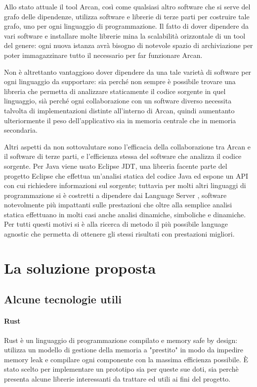 Allo stato attuale il tool Arcan, cos\`i come qualsiasi altro software che si serve del grafo delle dipendenze, utilizza software e librerie di terze parti per costruire tale grafo, uno per ogni linguaggio di programmazione. Il fatto di dover dipendere da vari software e installare molte librerie mina la scalabilit\`a orizzontale di un tool del genere: ogni nuova istanza avr\`a bisogno di notevole spazio di archiviazione per poter immagazzinare tutto il necessario per far funzionare Arcan.

Non \`e altrettanto vantaggioso dover dipendere da una tale variet\`a di software per ogni linguaggio da supportare: sia perch\'e non sempre \`e possibile trovare una libreria che permetta di analizzare staticamente il codice sorgente in quel linguaggio, si\`a perch\'e ogni collaborazione con un software diverso necessita talvolta di implementazioni distinte all'interno di Arcan, quindi aumentanto ulteriormente il peso dell'applicativo sia in memoria centrale che in memoria secondaria.

Altri aspetti da non sottovalutare sono l'efficacia della collaborazione tra Arcan e il software di terze parti, e l'efficienza stessa del software che analizza il codice sorgente. Per Java viene usato Eclipse JDT, una libreria facente parte del progetto Eclipse che effettua un'analisi statica del codice Java ed espone un API con cui richiedere informazioni sul sorgente; tuttavia per molti altri linguaggi di programmazione si \`e costretti a dipendere dai Language Server \cite{LanguageServer}, software notevolmente pi\`u impattanti sulle prestazioni che oltre alla semplice analisi statica effettuano in molti casi anche analisi dinamiche, simboliche e dinamiche. Per tutti questi motivi si \`e alla ricerca di metodo il pi\`u possibile language agnostic che permetta di ottenere gli stessi risultati con prestazioni migliori.

\section{La soluzione proposta}
\subsection{Alcune tecnologie utili}

\paragraph{Rust}

Rust \cite{blandy2017programming} \`e un linguaggio di programmazione compilato e memory safe by design: utilizza un modello di gestione della memoria a "prestito" in modo da impedire memory leak e compilare ogni componente con la massima efficienza possibile. \`E stato scelto per implementare un prototipo sia per queste sue doti, sia perch\`e presenta alcune librerie interessanti da trattare ed utili ai fini del progetto.

